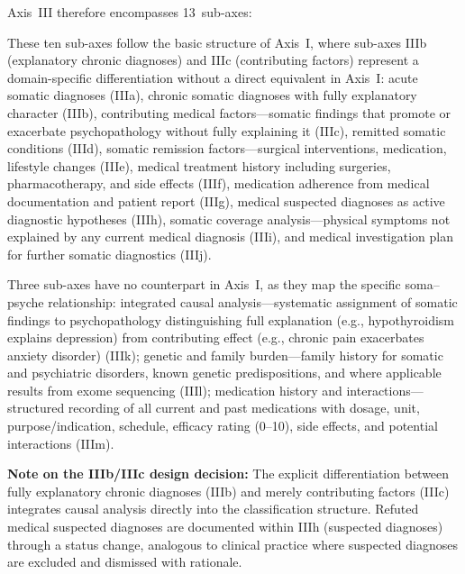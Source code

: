 \documentclass[11pt,a4paper]{article}
\begin{document}
Axis~III therefore encompasses 13~sub-axes:

\begin{description}[style=nextline, leftmargin=1.5cm, font=\bfseries]
\item[IIIa--IIIj: Parallel Core Structure] These ten sub-axes follow the basic structure of Axis~I, where sub-axes IIIb (explanatory chronic diagnoses) and IIIc (contributing factors) represent a domain-specific differentiation without a direct equivalent in Axis~I: acute somatic diagnoses (IIIa), chronic somatic diagnoses with fully explanatory character (IIIb), contributing medical factors---somatic findings that promote or exacerbate psychopathology without fully explaining it (IIIc), remitted somatic conditions (IIId), somatic remission factors---surgical interventions, medication, lifestyle changes (IIIe), medical treatment history including surgeries, pharmacotherapy, and side effects (IIIf), medication adherence from medical documentation and patient report (IIIg), medical suspected diagnoses as active diagnostic hypotheses (IIIh), somatic coverage analysis---physical symptoms not explained by any current medical diagnosis (IIIi), and medical investigation plan for further somatic diagnostics (IIIj).
\item[IIIk--IIIm: Axis-III-Specific Sub-Axes] Three sub-axes have no counterpart in Axis~I, as they map the specific soma--psyche relationship: integrated causal analysis---systematic assignment of somatic findings to psychopathology distinguishing full explanation (e.g., hypothyroidism explains depression) from contributing effect (e.g., chronic pain exacerbates anxiety disorder) (IIIk); genetic and family burden---family history for somatic and psychiatric disorders, known genetic predispositions, and where applicable results from exome sequencing (IIIl); medication history and interactions---structured recording of all current and past medications with dosage, unit, purpose/indication, schedule, efficacy rating (0--10), side effects, and potential interactions (IIIm).
\end{description}

\textbf{Note on the IIIb/IIIc design decision:} The explicit differentiation between fully explanatory chronic diagnoses (IIIb) and merely contributing factors (IIIc) integrates causal analysis directly into the classification structure. Refuted medical suspected diagnoses are documented within IIIh (suspected diagnoses) through a status change, analogous to clinical practice where suspected diagnoses are excluded and dismissed with rationale.
\end{document}
